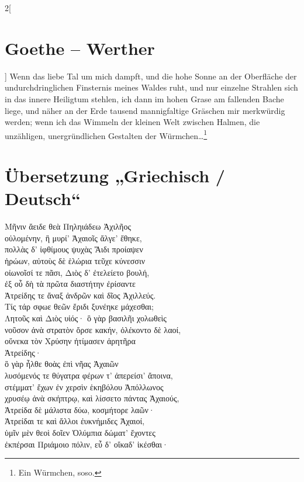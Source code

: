 \begin{multicols}{2}[\section{Goethe – Werther}]
Wenn das liebe Tal um mich dampft, und die hohe Sonne an der Oberfläche der undurchdringlichen Finsternis meines Waldes ruht, und nur einzelne Strahlen sich in das innere Heiligtum stehlen, ich dann im hohen Grase am fallenden Bache liege, und näher an der Erde tausend mannigfaltige Gräschen mir merkwürdig werden; wenn ich das Wimmeln der kleinen Welt zwischen Halmen, die unzähligen, unergründlichen Gestalten der Würmchen…\footnote{Ein Würmchen, soso.}
\end{multicols}

 
\section{Übersetzung „Griechisch / Deutsch“}

\begin{pairs}
\begin{Leftside}
\scriptsize
\beginnumbering
\pstart
Μῆνιν ἄειδε θεὰ Πηληιάδεω Ἀχιλῆος\\ 
οὐλομένην, ἣ μυρί' Ἀχαιοῖς ἄλγε' ἔθηκε,\\ 
πολλὰς δ' ἰφθίμους ψυχὰς Ἄιδι προίαψεν\\ 
ἡρώων, αὐτοὺς δὲ ἑλώρια τεῦχε κύνεσσιν\\	
οἰωνοῖσί τε πᾶσι, Διὸς δ' ἐτελείετο βουλή,\\ 
ἐξ οὗ δὴ τὰ πρῶτα διαστήτην ἐρίσαντε\\ 
Ἀτρείδης τε ἄναξ ἀνδρῶν καὶ δῖος Ἀχιλλεύς.\\ 
\pend
\pstart
Τίς τάρ σφωε θεῶν ἔριδι ξυνέηκε μάχεσθαι;\\ 
Λητοῦς καὶ Διὸς υἱός· ὃ γὰρ βασιλῆι χολωθεὶς\\ 
νοῦσον ἀνὰ στρατὸν ὄρσε κακήν, ὀλέκοντο δὲ λαοί,\\ 
οὕνεκα τὸν Xρύσην ἠτίμασεν ἀρητῆρα \\
Ἀτρείδης·\\
\pend
\pstart
ὃ γὰρ ἦλθε θοὰς ἐπὶ νῆας Ἀχαιῶν\\
λυσόμενός τε θύγατρα φέρων τ' ἀπερείσι' ἄποινα,\\
στέμματ' ἔχων ἐν χερσὶν ἑκηβόλου Ἀπόλλωνος\\
χρυσέῳ ἀνὰ σκήπτρῳ, καὶ λίσσετο πάντας Ἀχαιούς,\\ 
Ἀτρείδα δὲ μάλιστα δύω, κοσμήτορε λαῶν·\\
Ἀτρείδαι τε καὶ ἄλλοι ἐυκνήμιδες Ἀχαιοί,\\
ὑμῖν μὲν θεοὶ δοῖεν Ὀλύμπια δώματ' ἔχοντες\\ 
ἐκπέρσαι Πριάμοιο πόλιν, εὖ δ' οἴκαδ' ἱκέσθαι·\\
\pend
\endnumbering
\end{Leftside}


\end{pairs}
